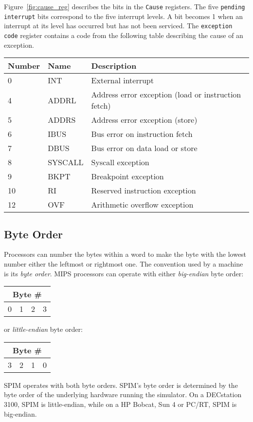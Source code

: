 Figure~\ref{fig:cause_reg} describes the bits in the {\tt Cause}
registers.  The five {\tt pending interrupt} bits correspond to the
five interrupt levels.  A bit becomes 1 when an interrupt at its level
has occurred but has not been serviced.  The {\tt exception code}
register contains a code from the following table describing the cause
of an exception.
\begin{center}
  \small
  \begin{tabular}{|l|l|l|}
    \hline
    {\bf Number} & {\bf Name} & {\bf Description} \\
    \hline
    \hline
    0 & INT & External interrupt \\
    4 & ADDRL & Address error exception (load or instruction fetch) \\
    5 & ADDRS & Address error exception (store) \\
    6 & IBUS & Bus error on instruction fetch \\
    7 & DBUS & Bus error on data load or store \\
    8 & SYSCALL & Syscall exception \\
    9 & BKPT & Breakpoint exception \\
    10&  RI & Reserved instruction exception \\
    12&  OVF & Arithmetic overflow exception \\
    \hline
  \end{tabular}
\end{center}

\subsection{Byte Order}

Processors can number the bytes within a word to make the byte with
the lowest number either the leftmost or rightmost one.  The convention
used by a machine is its {\em byte order\/}.  MIPS processors can
operate with either {\em big-endian\/} byte order:
\begin{center}
  \begin{tabular}{|c|c|c|c|}
    \multicolumn{4}{c}{{\bf Byte \#}} \\
    \hline
    0 & 1 & 2 & 3 \\
    \hline
  \end{tabular}
\end{center}
or {\em little-endian\/} byte order:
\begin{center}
  \begin{tabular}{|c|c|c|c|}
    \multicolumn{4}{c}{{\bf Byte \#}} \\
    \hline
    3 & 2 & 1 & 0 \\
    \hline
  \end{tabular}
\end{center}
SPIM operates with both byte orders.  SPIM's byte order is determined
by the byte order of the underlying hardware running the simulator.
On a DECstation 3100, SPIM is little-endian, while on a HP Bobcat, Sun
4 or PC/RT, SPIM is big-endian.

